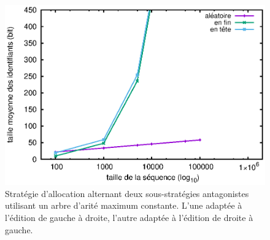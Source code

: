 \begin{figure}
  \centering
  \includegraphics[width=.8\textwidth]{./img/lseq/robin.eps}
  \caption{\label{fig:lseq:robin}Stratégie d'allocation alternant deux
    sous-stratégies antagonistes utilisant un arbre d'arité maximum
    constante. L'une adaptée à l'édition de gauche à droite, l'autre adaptée à
    l'édition de droite à gauche.}
\end{figure}


